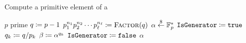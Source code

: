 \begin{algorithm}[t]
\caption{Compute a primitive element of a }
\label{alg:finite_field_generator}
\begin{algorithmic}[1]
\Require $p$ prime
    \State $q \coloneqq{} p-1$
    \State $p_{1}^{n_{1}}p_{2}^{n_{2}}\cdots p_{\ell}^{n_{\ell}}
        \coloneqq{} \textsc{Factor}(q)$
    \While{}
        \State $\alpha \stackrel{\$}{\leftarrow}{} \mathbb{F}_{p}^{*}$
        \State $\texttt{IsGenerator} \coloneqq{} \texttt{true}$
            \State $q_{k} \coloneqq{} q/p_{k}$
            \State $\beta \coloneqq{} \alpha^{q_{k}}$
                \State $\texttt{IsGenerator} \coloneqq{} \texttt{false}$
                \Break
            \EndIf
        \EndFor
            \Break
        \EndIf
    \EndWhile
    \State \Return $\alpha$
\EndProcedure
\end{algorithmic}
\end{algorithm}
